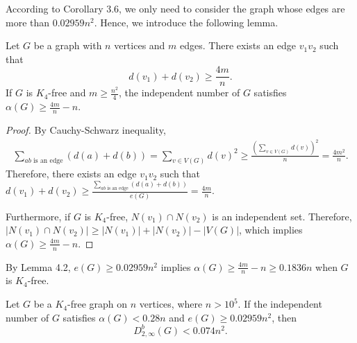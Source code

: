 \documentclass[11pt, oneside]{article}   	%
\begin{document}
According to Corollary 3.6, we only need to consider the graph whose edges are more than $0.02959n^2$. Hence, we introduce the following lemma.
\begin{lemma}
     Let $G$ be a graph with $n$ vertices and $m$ edges. There exists an edge $v_1v_2$ such that 
     \begin{equation}
        d(v_1)+d(v_2)\geq \frac{4m}{n}.
     \end{equation}
    If $G$ is $K_4$-free and $m\geq \frac{n^2} 4$, the independent number of $G$ satisfies $\alpha(G)\geq \frac{4m}n -n.$ 
\end{lemma}

\begin{proof}[Proof]
    By Cauchy-Schwarz inequality,
    $$
    \begin{aligned}
        \sum\limits_{ab\text{ is an edge}}(d(a)+d(b))
        =\sum\limits_{v\in V(G)}d(v)^2\geq \frac{\left(\sum\limits_{v\in V(G)}d(v)\right)^2}{n}=\frac{4m^2}n.
    \end{aligned}
    $$
    Therefore, there exists an edge $v_1 v_2$ such that $d(v_1)+d(v_2)\geq \frac{\sum\limits_{ab\text{ is an edge}}(d(a)+d(b))}{e(G)}=\frac{4m}{n}.$

    Furthermore, if $G$ is $K_4$-free, $N(v_1)\cap N(v_2)$ is an independent set. Therefore, $|N(v_1)\cap N(v_2)|\geq |N(v_1)|+|N(v_2)|-|V(G)|$, which implies $\alpha(G)\geq \frac{4m}{n}-n.$
\end{proof}

By Lemma 4.2, $e(G)\geq 0.02959n^2$ implies $\alpha(G)\geq \frac{4m}{n}-n\geq 0.1836n$ when $G$ is $K_4$-free. 

\begin{lemma}
Let $G$ be a $K_4$-free graph on $n$ vertices, where $n>10^5$. If the independent number of $G$ satisfies $\alpha(G)<0.28n$ and $e(G)\geq 0.02959n^2$, then 
    $$
        D_{2,\infty}^b(G)< 0.074n^2.
    $$
\end{lemma} 
\end{document}
